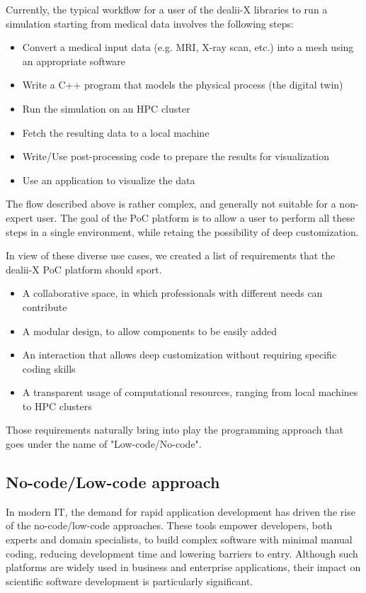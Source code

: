 \documentclass[a4paper,12pt]{article}
\begin{document}
Currently, the typical workflow for a user of the dealii-X libraries to run a simulation starting from medical data involves the following steps:
\begin{itemize}
    \item Convert a medical input data (e.g. MRI, X-ray scan, etc.) into a mesh using an appropriate software  
    \item Write a C++ program that models the physical process (the digital twin)
    \item Run the simulation on an HPC cluster
    \item Fetch the resulting data to a local machine
    \item Write/Use post-processing code to prepare the results for visualization
    \item Use an application to visualize the data
\end{itemize} 
The flow described above is rather complex, and generally not suitable for a non-expert user. The goal of the PoC platform is to allow a user to perform all these steps in a single environment, while retaing the possibility of deep customization.

In view of these diverse use cases, we created a list of requirements that the dealii-X PoC platform should sport.
\begin{itemize}
    \item A collaborative space, in which professionals with different needs can contribute
    \item A modular design, to allow components to be easily added
    \item An interaction that allows deep customization without requiring specific coding skills
    \item A transparent usage of computational resources, ranging from local machines to HPC clusters
\end{itemize}

Those requirements naturally bring into play the programming approach that goes under the name of "Low-code/No-code".

\subsection{\textcolor{EUblue}{No-code/Low-code approach}}

In modern IT, the demand for rapid application development has driven the rise of the no-code/low-code approaches. These tools empower developers, both experts and domain specialists, to build complex software with minimal manual coding, reducing development time and lowering barriers to entry. Although such platforms are widely used in business and enterprise applications, their impact on scientific software development is particularly significant.
\end{document}
